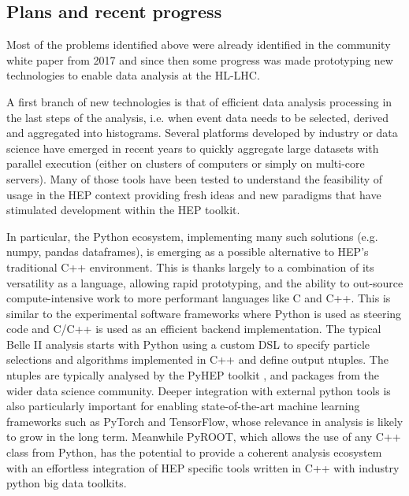 \documentclass[11pt,a4paper]{article}
\begin{document}
\hypertarget{plans-and-recent-progress}{%
\subsection{Plans and recent progress}\label{plans-and-recent-progress}}

Most of the problems identified above were already identified in the
community white paper \cite{Ref17} from 2017 and since then some progress
was made prototyping new technologies to enable data analysis at the
HL-LHC.

A first branch of new technologies is that of efficient data analysis
processing in the last steps of the analysis, i.e. when event data needs
to be selected, derived and aggregated into histograms. Several
platforms developed by industry or data science have emerged in recent
years to quickly aggregate large datasets with parallel execution
(either on clusters of computers or simply on multi-core servers). Many
of those tools have been tested to understand the feasibility of usage
in the HEP context providing fresh ideas and new paradigms that have
stimulated development within the HEP toolkit.

In particular, the Python ecosystem, implementing many such solutions
(e.g. numpy, pandas dataframes), is emerging as a possible alternative
to HEP's traditional C++ environment. This is thanks largely to a
combination of its versatility as a language, allowing rapid
prototyping, and the ability to out-source compute-intensive work to
more performant languages like C and C++. This is similar to the
experimental software frameworks where Python is used as steering code
and C/C++ is used as an efficient backend implementation. The typical
Belle II analysis starts with Python using a custom DSL to specify
particle selections and algorithms implemented in C++ and define output
ntuples. The ntuples are typically analysed by the PyHEP toolkit
\cite{Ref6}, and packages from the wider data science community. Deeper
integration with external python tools is also particularly important
for enabling state-of-the-art machine learning frameworks such as
PyTorch and TensorFlow, whose relevance in analysis is likely to grow in
the long term. Meanwhile PyROOT, which allows the use of any C++ class
from Python, has the potential to provide a coherent analysis ecosystem
with an effortless integration of HEP specific tools written in C++ with
industry python big data toolkits.
\end{document}
